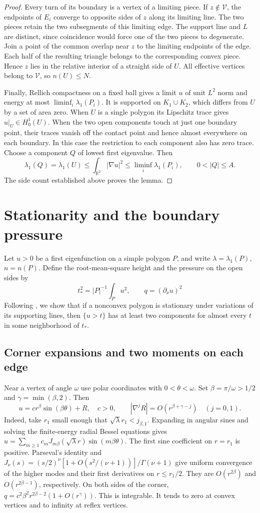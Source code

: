 \documentclass[11pt,a4paper,reqno]{amsart}
\theoremstyle{remark}
\numberwithin{equation}{section}
\newcommand{\R}{\mathbb R}
\begin{document}
\begin{proof}
Every turn of its boundary is a vertex of a limiting piece. If
$z\notin\mathcal V$, the endpoints of $E_i$ converge to opposite sides of
$z$ along its limiting line. The two pieces retain the two subsegments of
this limiting edge. The support line and $L$ are distinct, since coincidence
would force one of the two pieces to degenerate. Join a point of the common
overlap near $z$ to the limiting endpoints of the edge. Each half of the
resulting triangle belongs to the corresponding convex piece. Hence $z$
lies in the relative interior of a straight side of $U$. All effective
vertices belong to $\mathcal V$, so $n(U)\le N$.

Finally, Rellich compactness on a fixed ball gives a limit $u$ of unit
$L^2$ norm and energy at most $\liminf_i\lambda_1(P_i)$. It is supported
on $K_1\cup K_2$, which differs from $U$ by a set of area zero.
When $U$ is a single polygon its Lipschitz trace gives $u|_U\in H_0^1(U)$.
When the two open components touch at just one boundary point, their
traces vanish off the contact point and hence almost everywhere on each
boundary. In this case the restriction to each component also has zero
trace. Choose a component $Q$ of lowest first eigenvalue. Then
\[
 \lambda_1(Q)=\lambda_1(U)\le\int_{\R^2}|\nabla u|^2\le\liminf_i\lambda_1(P_i),
 \qquad 0<|Q|\le A.
\]
The side count established above proves the lemma.
\end{proof}

\section{Stationarity and the boundary pressure}\label{sec:pressure}
Let $u>0$ be a first eigenfunction on a simple polygon $P$, and write
$\lambda=\lambda_1(P)$, $n=n(P)$. Define the root-mean-square height and the
pressure on the open sides by
\[
     t_*^2=|P|^{-1}\int_Pu^2,\qquad q=(\partial_\nu u)^2
\]
Following \cite{cheng}, we show that if a nonconvex polygon is stationary
under variations of its supporting lines, then $\{u>t\}$ has at least two
components for almost every $t$ in some neighborhood of $t_*$.

\subsection{Corner expansions and two moments on each edge}
Near a vertex of angle $\omega$ use polar coordinates with $0<\theta<\omega$.
Set $\beta=\pi/\omega>1/2$ and $\gamma=\min(\beta,2)$. Then
\[
 u=c r^\beta\sin(\beta\theta)+R,\quad c>0,\qquad
 |\nabla^j R|=O(r^{\beta+\gamma-j})\quad(j=0,1).
\]
Indeed, take $r_1$ small enough that $\sqrt\lambda r_1<j_{\beta,1}$.
Expanding in angular sines and solving the finite-energy radial Bessel
equations gives
$u=\sum_{m\ge1}c_mJ_{m\beta}(\sqrt\lambda r)\sin(m\beta\theta)$.
The first sine coefficient on $r=r_1$ is positive. Parseval's identity
and $J_\nu(s)=(s/2)^\nu[1+O(s^2/(\nu+1))]/\Gamma(\nu+1)$ give uniform
convergence of the higher modes and their first derivatives on $r\le r_1/2$.
They are $O(r^{2\beta})$ and $O(r^{2\beta-1})$, respectively. On both sides
of the corner,
$q=c^2\beta^2r^{2\beta-2}(1+O(r^\gamma))$. This is integrable. It tends to
zero at convex vertices and to infinity at reflex vertices.
\end{document}
